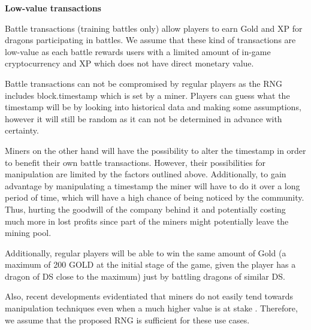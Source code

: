 \documentclass[12pt]{article}
\begin{document}
\begin{justify}
\textbf{Low-value transactions}
\end{justify}\par

\begin{justify}
Battle transactions (training battles only) allow players to earn Gold and XP for dragons participating in battles. We assume that these kind of transactions are low-value as each battle rewards users with a limited amount of in-game cryptocurrency and XP which does not have direct monetary value.
\end{justify}\par

\begin{justify}
Battle transactions can not be compromised by regular players as the RNG includes block.timestamp which is set by a miner. Players can guess what the timestamp will be by looking into historical data and making some assumptions, however it will still be random as it can not be determined in advance with certainty.
\end{justify}\par

\begin{justify}
Miners on the other hand will have the possibility to alter the timestamp in order to benefit their own battle transactions. However, their possibilities for manipulation are limited by the factors outlined above. Additionally, to gain advantage by manipulating a timestamp the miner will have to do it over a long period of time, which will have a high chance of being noticed by the community. Thus, hurting the goodwill of the company behind it and potentially costing much more in lost profits since part of the miners might potentially leave the mining pool.
\end{justify}\par

\begin{justify}
Additionally, regular players will be able to win the same amount of Gold (a maximum of 200 GOLD at the initial stage of the game, given the player has a dragon of DS close to the maximum) just by battling dragons of similar DS.
\end{justify}\par

\begin{justify}
Also, recent developments evidentiated that miners do not easily tend towards manipulation techniques even when a much higher value is at stake  \cite{SECBIT_2018_Aug_22}. Therefore, we assume that the proposed RNG is sufficient for these use cases.
\end{justify}\par
\end{document}
